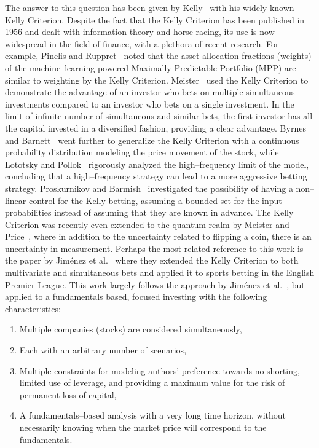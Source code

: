 \documentclass{article}
\begin{document}
\indent The answer to this question has been given by Kelly~\cite{kelly} with
his widely known Kelly Criterion. Despite the fact that the Kelly Criterion has
been published in 1956 and dealt with information theory and horse racing, its
use is now widespread in the field of finance, with a plethora of recent
research. For example, Pinelis and Ruppret~\cite{pinelisRuppert} noted that the
asset allocation fractions (weights) of the machine--learning powered Maximally
Predictable Portfolio (MPP) are similar to weighting by the Kelly Criterion.
Meister~\cite{meister} used the Kelly Criterion to demonstrate the advantage of
an investor who bets on multiple simultaneous investments compared to an
investor who bets on a single investment. In the limit of infinite number of
simultaneous and similar bets, the first investor has all the capital invested
in a diversified fashion, providing a clear advantage. Byrnes and
Barnett~\cite{byrnesBarnett} went further to generalize the Kelly Criterion with
a continuous probability distribution modeling the price movement of the stock,
while Lototsky and Pollok~\cite{lototskyPollok} rigorously analyzed the
high--frequency limit of the model, concluding that a high--frequency
strategy can lead to a more aggressive betting strategy.  Proskurnikov and
Barmish~\cite{proskurnikovBarmish} investigated the possibility of having a
non--linear control for the Kelly betting, assuming a bounded set for the
input probabilities instead of assuming that they are known in advance.  The
Kelly Criterion was recently even extended to the quantum realm by Meister
and Price~\cite{meisterPrice}, where in addition to the uncertainty related
to flipping a coin, there is an uncertainty in measurement. Perhaps the most
related reference to this work is the paper by Jim\'{e}nez et
al.~\cite{jimenezEtAl} where they extended the Kelly Criterion to both
multivariate and simultaneous bets and applied it to sports betting in the
English Premier League. This work largely follows the approach by
Jim\'{e}nez et al.~\cite{jimenezEtAl}, but applied to a fundamentals based,
focused investing with the following characteristics:
\begin{enumerate}
    \item Multiple companies (stocks) are considered simultaneously,
    \item Each with an arbitrary number of scenarios,
    \item Multiple constraints for modeling authors' preference towards no
    shorting, limited use of leverage, and providing a maximum value for the
    risk of permanent loss of capital,
    \item A fundamentals--based analysis with a very long time horizon, without
    necessarily knowing when the market price will correspond to the
    fundamentals.
\end{enumerate}
\end{document}
